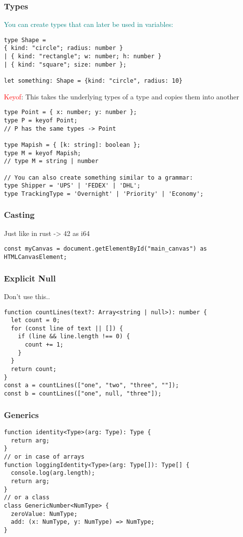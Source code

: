 \documentclass[main.tex,fontsize=8pt,paper=a4,paper=portrait,DIV=calc,]{scrartcl}
\begin{document}
\subsubsection{Types}
\textcolor{teal}{You can create types that can later be used in variables:}
\begin{lstlisting}
type Shape =
{ kind: "circle"; radius: number }
| { kind: "rectangle"; w: number; h: number }
| { kind: "square"; size: number };

let something: Shape = {kind: "circle", radius: 10}
\end{lstlisting}
\textcolor{red}{Keyof}: This takes the underlying types of a type and copies them into another
\begin{lstlisting}
type Point = { x: number; y: number };
type P = keyof Point;
// P has the same types -> Point

type Mapish = { [k: string]: boolean };
type M = keyof Mapish;   
// type M = string | number

// You can also create something similar to a grammar:
type Shipper = 'UPS' | 'FEDEX' | 'DHL';
type TrackingType = 'Overnight' | 'Priority' | 'Economy';
\end{lstlisting}

\subsubsection{Casting}
Just like in rust -> 42 as i64
\begin{lstlisting}
const myCanvas = document.getElementById("main_canvas") as HTMLCanvasElement;
\end{lstlisting}

\subsubsection{Explicit Null}
Don't use this..
\begin{lstlisting}
function countLines(text?: Array<string | null>): number {
  let count = 0;
  for (const line of text || []) {
    if (line && line.length !== 0) {
      count += 1;
    }
  }
  return count;
}
const a = countLines(["one", "two", "three", ""]);
const b = countLines(["one", null, "three"]);
\end{lstlisting}

\subsubsection{Generics}
\begin{lstlisting}
function identity<Type>(arg: Type): Type {
  return arg;
}
// or in case of arrays
function loggingIdentity<Type>(arg: Type[]): Type[] {
  console.log(arg.length);
  return arg;
}
// or a class
class GenericNumber<NumType> {
  zeroValue: NumType;
  add: (x: NumType, y: NumType) => NumType;
}
\end{lstlisting}


\lstset{
    language=CSS,
    style=code,
}

\lstset{
    language=HTML,
    style=code,
}
\end{document}
